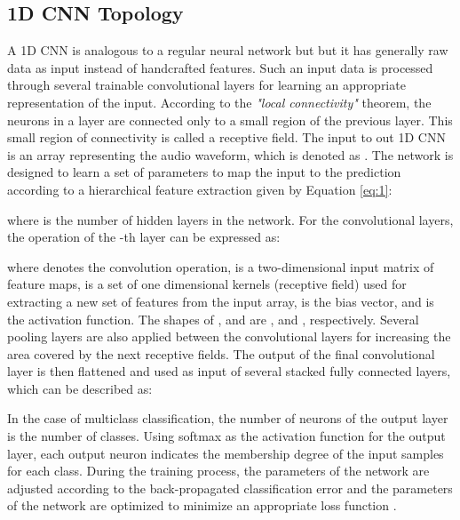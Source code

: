 \documentclass[preprint,final,12pt]{elsarticle}
\begin{document}
\subsection{1D CNN Topology}
\label{sub:Topology}
A 1D CNN is analogous to a regular neural network but but it has generally raw data as input instead of handcrafted features. Such an input data is processed through several trainable convolutional layers for learning an appropriate representation of the input. According to the \textit{"local connectivity"} theorem, the neurons in a layer are connected only to a small region of the previous layer. This small region of connectivity is called a receptive field. The input to out 1D CNN is an array representing the audio waveform, which is denoted as . The network is designed to learn a set of parameters  to map the input to the prediction  according to a hierarchical feature extraction given by Equation \ref{eq:1}:



\noindent where  is the number of hidden layers in the network. For the convolutional layers, the operation of the -th layer can be expressed as:



\noindent where  denotes the convolution operation,  is a two-dimensional input matrix of  feature maps,  is a set of  one dimensional kernels (receptive field) used for extracting a new set of features from the input array,  is the bias vector, and  is the activation function. The shapes of ,  and  are ,  and , respectively. Several pooling layers are also applied between the convolutional layers for increasing the area covered by the next receptive fields. The output of the final convolutional layer is then flattened and used as input of several stacked fully connected layers, which can be described as:



In the case of multiclass classification, the number of neurons of the output layer is the number of classes. Using softmax as the activation function for the output layer, each output neuron indicates the membership degree of the input samples for each class. During the training process, the parameters of the network are adjusted according to the back-propagated classification error and the parameters of the network are optimized to minimize an appropriate loss function \citep{Goodfellow-et-al-2016}.
\end{document}
